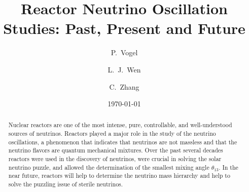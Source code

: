 \documentclass[aps,twocolumn,preprintnumbers,amsmath,superscriptaddress,amssymb,floats,nofootinbib]{revtex4-1}
\begin{document}
\title{Reactor Neutrino Oscillation Studies: Past, Present and Future}
\date{\today}
\author{P.~Vogel}
\author{L.~J.~Wen}
\author{C.~Zhang}


\begin{abstract}
Nuclear reactors are one of the most intense, pure, controllable, and well-understood sources of neutrinos. Reactors played a major role in the study of the neutrino oscillations, a phenomenon that indicates that neutrinos are not massless and that the neutrino flavors are quantum mechanical mixtures. Over the past several decades reactors were used in the discovery of neutrinos, were crucial in solving the solar neutrino puzzle, and allowed the determination of the smallest mixing angle $\theta_{13}$. In the near future, reactors will help to determine the neutrino mass hierarchy and help to solve the puzzling issue of sterile neutrinos.
\end{abstract}

\maketitle
\thispagestyle{plain}








%


\end{document}
